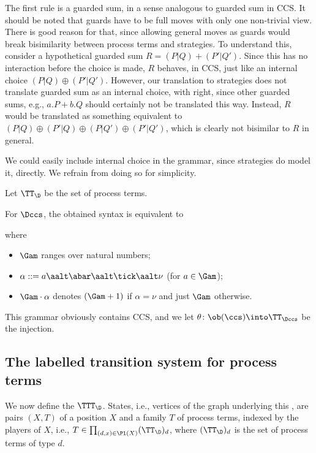 \documentclass{LMCS}
\theoremstyle{plain}\newtheorem{satz}[thm]{Satz}
\begin{document}
    The first rule is a guarded sum, in a sense analogous to guarded
    sum in CCS. It should be noted that guards have to be full moves
    with only one non-trivial view. There is good reason for that,
    since allowing general moves as guards would break bisimilarity
    between process terms and strategies. To understand this, consider
    a hypothetical guarded sum $R = (P|Q) + (P'|Q')$. Since this has no
    interaction before the choice is made, $R$ behaves, in CCS, just
    like an internal choice $(P|Q) \oplus (P'|Q')$. However, our
    translation to strategies does not translate guarded sum as an
    internal choice, with right, since other guarded sums, e.g., $a.P
    + b. Q$ should certainly not be translated this way. Instead, $R$
    would be translated as something equivalent to $(P|Q) \oplus
    (P'|Q) \oplus (P|Q') \oplus (P'|Q')$, which is clearly not
    bisimilar to $R$ in general.


    We could easily include internal choice in the grammar, since
    strategies do model it, directly. We refrain from doing so for
    simplicity.


\begin{defi}
  Let $\TT_\D$ be the set of process terms.
\end{defi}


\begin{exa}\label{ex:ccs:terms}
  For $\Dccs$, the obtained syntax is equivalent to
  where
  \begin{itemize}
  \item $\Gam$ ranges over natural numbers;
  \item $\alpha ::= a \aalt \abar
    \aalt \tick \aalt \nu$ (for $a \in \Gam$);
  \item $\Gam \cdot \alpha$ denotes $(\Gam + 1)$ if $\alpha = \nu$ and
    just $\Gam$ otherwise.
  \end{itemize}
  This grammar obviously contains CCS, and we let $\theta \colon
  \ob(\ccs) \into \TT_{\Dccs}$ be the injection.
\end{exa}


\subsection{The labelled transition system for process terms}
We now define the \lts{} $\TTT_\D$. States, i.e., vertices of
the graph underlying this \lts{}, are pairs $(X, T)$ of a position $X$
and a family $T$ of process terms, indexed by the players of $X$,
i.e., $T \in \prod_{(d,x) \in \Pl (X)} (\TT_\D)_d$, where $(\TT_\D)_d$
is the set of process terms of type $d$.
\end{document}
